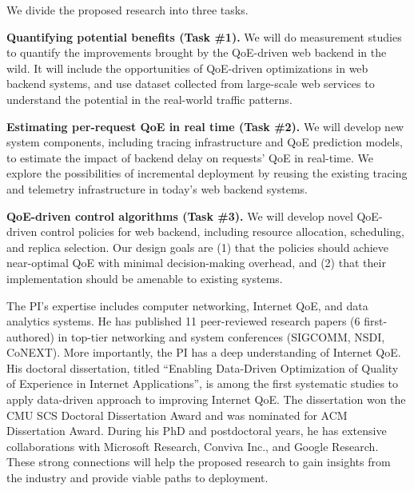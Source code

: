 We divide the proposed research into three tasks.

\begin{packeditemize}
\item{\bf Quantifying potential benefits (Task \#1).}
We will do measurement studies to quantify the improvements brought by the QoE-driven web backend in the wild. It will include the opportunities of QoE-driven optimizations in web backend systems, and use dataset collected from large-scale web services to understand the potential in the real-world traffic patterns.

\item{\bf Estimating per-request QoE in real time (Task \#2).}
We will develop new system components, including tracing infrastructure and QoE prediction models, to estimate the impact of backend delay on requests' QoE in real-time. We explore the possibilities of incremental deployment by reusing the existing tracing and telemetry infrastructure in today's web backend systems.

\item{\bf QoE-driven control algorithms (Task \#3).}
We will develop novel QoE-driven control policies for web backend, including resource allocation, scheduling, and replica selection. Our design goals are (1) that the policies should achieve near-optimal QoE with minimal decision-making overhead, and (2) that their implementation should be amenable to existing systems.


\end{packeditemize}




The PI's expertise includes computer networking, Internet QoE, and data analytics systems.
He has published 11 peer-reviewed research papers (6 first-authored) in top-tier networking and system conferences (\ie SIGCOMM, NSDI, CoNEXT).
More importantly, the PI has a deep understanding of Internet QoE. His doctoral dissertation, titled ``Enabling Data-Driven Optimization of Quality of Experience in Internet Applications'', is among the first systematic studies to apply data-driven approach to improving Internet  QoE. The dissertation won the CMU SCS Doctoral Dissertation Award and was nominated for ACM Dissertation Award.
During his PhD and postdoctoral years, he has extensive collaborations with Microsoft Research, Conviva Inc., and Google Research. These strong connections will help the proposed research to gain insights from the industry and provide viable paths to deployment.


